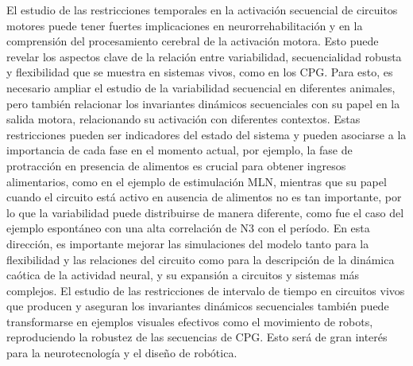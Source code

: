 El estudio de las restricciones temporales en la activación secuencial de circuitos motores puede tener fuertes implicaciones en neurorrehabilitación y en la comprensión del procesamiento cerebral de la activación motora. Esto puede revelar los aspectos clave de la relación entre variabilidad, secuencialidad robusta y flexibilidad que se muestra en sistemas vivos, como en los CPG. Para esto, es necesario ampliar el estudio de la variabilidad secuencial en diferentes animales, pero también relacionar los invariantes dinámicos secuenciales con su papel en la salida motora, relacionando su activación con diferentes contextos. Estas restricciones pueden ser indicadores del estado del sistema y pueden asociarse a la importancia de cada fase en el momento actual, por ejemplo, la fase de protracción en presencia de alimentos es crucial para obtener ingresos alimentarios, como en el ejemplo de estimulación MLN, mientras que su papel cuando el circuito está activo en ausencia de alimentos no es tan importante, por lo que la variabilidad puede distribuirse de manera diferente, como fue el caso del ejemplo espontáneo con una alta correlación de N3 con el período. En esta dirección, es importante mejorar las simulaciones del modelo tanto para la flexibilidad y las relaciones del circuito como para la descripción de la dinámica caótica de la actividad neural, y su expansión a circuitos y sistemas más complejos. El estudio de las restricciones de intervalo de tiempo en circuitos vivos que producen y aseguran los invariantes dinámicos secuenciales también puede transformarse en ejemplos visuales efectivos como el movimiento de robots, reproduciendo la robustez de las secuencias de CPG. Esto será de gran interés para la neurotecnología y el diseño de robótica.

